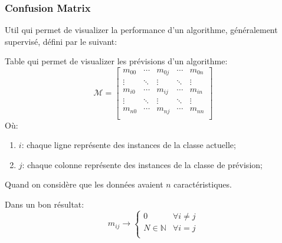 \documentclass{article}
\begin{document}
\subsubsection{Confusion Matrix}
Util qui permet de visualizer la performance d'un algorithme, généralement supervisé, défini par le suivant:
\begin{definition}
    Table qui permet de visualizer les prévisions d'un algorithme:
    \begin{equation}
        \boxed{
            \mathcal{M} = 
            \begin{bmatrix}
                m_{00} & \cdots & m_{0j} & \cdots & m_{0n}\\
                \vdots & \ddots & \vdots & \ddots & \vdots\\
                m_{i0} & \cdots & m_{ij} & \cdots & m_{in}\\ 
                \vdots & \ddots & \vdots & \ddots & \vdots\\
                m_{n0} & \cdots & m_{nj} & \cdots & m_{nn}\\ 
            \end{bmatrix}
        }
    \end{equation}
    Où:
    \begin{enumerate}[noitemsep]
        \item $i$: chaque ligne représente des instances de la classe actuelle;
        \item $j$: chaque colonne représente des instances de la classe de prévision;
    \end{enumerate}
    Quand on considère que les données avaient $n$ caractéristiques.
    \begin{remark}
        Dans un bon résultat:
        \begin{equation*}
            m_{ij} \to 
            \begin{cases}
                0 & \forall i\neq j\\
                N\in\mathbb{N} & \forall i= j\\
            \end{cases}
        \end{equation*}
    \end{remark}
\end{definition}
\end{document}
